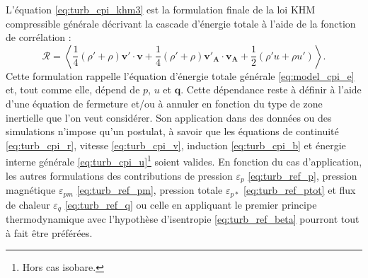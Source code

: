 L'équation \eqref{eq:turb_cpi_khm3} est la formulation finale de la loi \acs{KHM} compressible générale décrivant la cascade d'énergie totale à l'aide de la fonction de corrélation :  
\begin{equation*}
    \mathcal{R} = \left<\frac{1}{4} \left(\rho'+\rho\right) \boldsymbol{v'} \cdot  \boldsymbol{v} + \frac{1}{4} \left(\rho'+\rho\right) \boldsymbol{v'_A} \cdot  \boldsymbol{v_A} +\frac{1}{2} \left(\rho' u + \rho u'\right)\right>.
\end{equation*}
Cette formulation rappelle l'équation d'énergie totale générale \eqref{eq:model_cpi_e} et, tout comme elle, dépend de $p$, $u$ et $\boldsymbol{q}$. Cette dépendance reste à définir à l'aide d'une équation de fermeture et/ou à annuler en fonction du type de zone inertielle que l'on veut considérer. Son application dans des données ou des simulations n'impose qu'un postulat, à savoir que les équations de continuité \eqref{eq:turb_cpi_r}, vitesse \eqref{eq:turb_cpi_v}, induction \eqref{eq:turb_cpi_b} et énergie interne générale \eqref{eq:turb_cpi_u}\footnote{Hors cas isobare.} soient valides. En fonction du cas d'application, les autres formulations des contributions de pression $\varepsilon_p$ \eqref{eq:turb_ref_p}, pression magnétique $\varepsilon_{pm}$ \eqref{eq:turb_ref_pm}, pression totale $\varepsilon_{p*}$ \eqref{eq:turb_ref_ptot} et flux de chaleur $\varepsilon_q$ \eqref{eq:turb_ref_q} ou celle en appliquant le premier principe thermodynamique avec l'hypothèse d'isentropie \eqref{eq:turb_ref_beta} pourront tout à fait être préférées.

